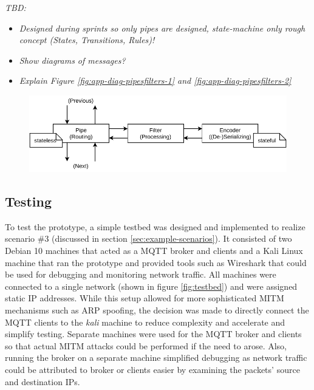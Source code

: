 \emph{TBD:}
\begin{itemize}
    \item \emph{Designed during sprints so only pipes are designed, state-machine only rough concept (States, Transitions, Rules)!}
    \item \emph{Show diagrams of messages?}
    \item \emph{Explain Figure \ref{fig:app-diag-pipesfilters-1} and \ref{fig:app-diag-pipesfilters-2}}
\end{itemize}


\begin{figure}
    \centering
    \includegraphics[width=14cm]{img/ch04/Architecture - Pipes and Filters3.pdf}
    \label{fig:design-pipes-and-filters}
\end{figure}

\subsection{Testing}
\label{sec:prototype-testing}
To test the prototype, a simple testbed was designed and implemented to realize scenario \#3 (discussed in section \ref{sec:example-scenarios}). It consisted of two Debian 10 machines that acted as a \ac{MQTT} broker and clients and a Kali Linux machine that ran the prototype and provided tools such as Wireshark that could be used for debugging and monitoring network traffic. All machines were connected to a single network (shown in figure \ref{fig:testbed}) and were assigned static \ac{IP} addresses. While this setup allowed for more sophisticated \ac{MITM} mechanisms such as \ac{ARP} spoofing, the decision was made to directly connect the \ac{MQTT} clients to the \emph{kali} machine to reduce complexity and accelerate and simplify testing. Separate machines were used for the \ac{MQTT} broker and clients so that actual \ac{MITM} attacks could be performed if the need to arose. Also, running the broker on a separate machine simplified debugging as network traffic could be attributed to broker or clients easier by examining the packets' source and destination \acp{IP}.\par

